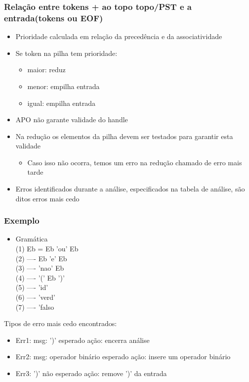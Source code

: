 \documentclass[11pt]{article}
\begin{document}
\subsubsection{Relação entre tokens + ao topo topo/PST e a entrada(tokens ou EOF)}
\label{sec:org97c426e}
\begin{itemize}
\item Prioridade calculada em relação da precedência e da
associatividade
\item Se token na pilha tem prioridade:
\begin{itemize}
\item maior: reduz
\item menor: empilha entrada
\item igual: empilha entrada
\end{itemize}
\item APO não garante validade do handle
\item Na redução os elementos da pilha devem ser testados para
garantir esta validade
\begin{itemize}
\item Caso isso não ocorra, temos um erro na redução chamado de erro
mais tarde
\end{itemize}
\item Erros identificados durante a análise, especificados na tabela
de análise, são ditos erros mais cedo
\end{itemize}
\subsubsection{Exemplo}
\label{sec:org28e5308}
\begin{itemize}
\item Gramática\\
(1) Eb = Eb 'ou' Eb\\
(2) ---- Eb 'e' Eb\\
(3) ---- 'nao' Eb\\
(4) ---- '(' Eb ')'\\
(5) ---- 'id'\\
(6) ---- 'verd'\\
(7) ---- 'falso\\
\end{itemize}

Tipos de erro mais cedo encontrados:
\begin{itemize}
\item Err1:
msg: ')' esperado
ação: encerra análise
\item Err2:
msg: operador binário esperado
ação: insere um operador binário
\item Err3: ')' não esperado
ação: remove ')' da entrada
\end{itemize}
\end{document}
